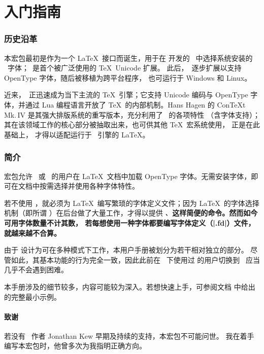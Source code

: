 \documentclass[a4paper]{l3doc}
\begin{document}
\part{入门指南}

\section{历史沿革}

本宏包最初是作为一个 \LaTeX\ 接口而诞生，用于在  开发的 \XeTeX\
中选择系统安装的 \MacOSX\ 字体；\XeTeX\ 是首个被广泛使用的 \TeX\ Unicode 扩展。
此后，\XeTeX\ 逐步扩展以支持 OpenType 字体，随后被移植为跨平台程序，
也可运行于 Windows 和 Linux。

近来，\LuaTeX\ 正迅速成为当下主流的 \TeX\ 引擎；它支持 Unicode 编码与 OpenType
字体，并通过 Lua 编程语言开放了 \TeX\ 的内部机制。Hans Hagen 的
Con\TeX t Mk.\,IV 是其强大排版系统的重写版本，充分利用了 \LuaTeX\ 的各项特性
（含字体支持）；其在该领域工作的核心部分被抽取出来，也可供其他 \TeX\ 宏系统使用，
正是在此基础上， 才得以适配运行于 \LuaTeX\ 引擎的 \LaTeX。



\section{简介}

 宏包允许 \XeTeX\ 或 \LuaTeX\ 的用户在 \LaTeX\ 文档中加载 OpenType
字体。无需安装字体，即可在文档中按需选择并使用各种字体特性。

若不使用 ，就必须为 \LaTeX\ 编写繁琐的字体定义文件；因为
\LaTeX\ 的字体选择机制（即所谓 \NFSS）在后台做了大量工作，才得以提供
\cmd\emph、\cmd\bfseries 这样简便的命令。然而如今可用字体数量不计其数，
若每想使用一种字体都要编写字体定义（|.fd|）文件，就越来越不合算。

由于  设计为可在多种模式下工作，本用户手册被划分为若干相对独立的部分。
尽管如此，其基本功能的行为完全一致，因此此前在 \XeTeX\ 下使用过 \pkg{fontspec}
的用户切换到 \LuaTeX\ 应当几乎不会遇到困难。

本手册涉及的细节较多，内容可能较为深入。若想快速上手，可参阅文档
 中给出的完整最小示例。


\subsection{致谢}

若没有 \XeTeX\ 作者 Jonathan Kew 早期及持续的支持，本宏包不可能问世。
我在着手编写本宏包时，他曾多次为我指明正确方向。
\end{document}
